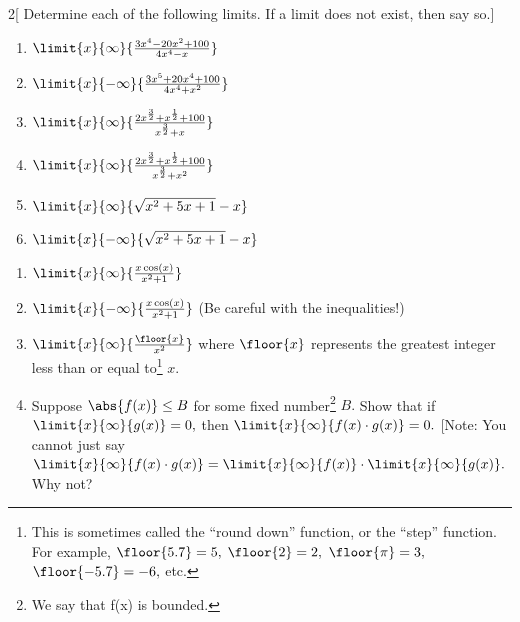   \begin{ProblemSection}
    \begin{embeddedproblem}{}
      \begin{multicols}{2}[    Determine each of the following
        limits. If a limit does not exist, then say so.]
        \begin{enumerate}[label={\bf{}(\alph*)}]
        \item $\limit{x}{\infty}{\frac{3x^4-20x^2+100}{4x^4-x}}$
        \item $\limit{x}{-\infty}{\frac{3x^5+20x^4+100}{4x^4+x^2}}$
        \item $\limit{x}{\infty}{\frac{2x^{\frac32}+x^{\frac12}+100}{x^{\frac32}+x}}$
        \item $\limit{x}{\infty}{\frac{2x^{\frac32}+x^{\frac12}+100}{x^{\frac32}+x^2}}$
        \item $\limit{x}{\infty}{\sqrt{x^2+5x+1}-x}$
        \item $\limit{x}{-\infty}{\sqrt{x^2+5x+1}-x}$
        \end{enumerate}
      \end{multicols}
  \end{embeddedproblem}
  \end{ProblemSection}

\begin{ProblemSection}
  \begin{embeddedproblem}{}
    \begin{enumerate}[label={\bf{}(\alph*)}]
    \item $\limit{x}{\infty}{\frac{x\cos(x)}{x^2+1}}$
    \item $\limit{x}{-\infty}{\frac{x\cos(x)}{x^2+1}}$ (Be careful
      with the inequalities!)
    \item $\limit{x}{\infty}{\frac{\floor{x}}{x^2}}$ where $\floor{x}$
      represents the greatest integer less than or equal
      to\footnote{This is sometimes called the ``round down''
        function, or the ``step'' function.  For example,
        $\floor{5.7}=5,$ $\floor{2}=2,$ $\floor{\pi}=3,$
        $\floor{-5.7}=-6,$ etc.} $x.$
    \item 	Suppose $\abs{f(x)}\le B$ for some fixed
      number\footnote{We say that f(x) is bounded.} $B.$   Show that
      if $\limit{x}{\infty}{g(x)}=0,$ then
      $\limit{x}{\infty}{f(x)\cdot g(x)}=0.$  [Note: You cannot just
      say $\limit{x}{\infty}{f(x)\cdot g(x)}
      = \limit{x}{\infty}{f(x)}\cdot\limit{x}{\infty}{g(x)}.$ Why not?
    \end{enumerate}
  \end{embeddedproblem}
\end{ProblemSection}

